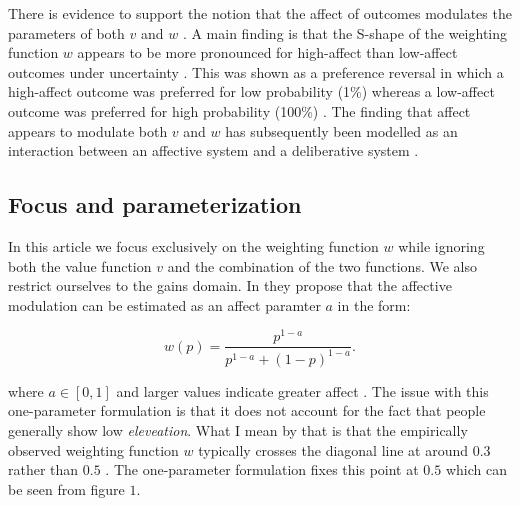 \documentclass[12pt]{article}
\begin{document}
There is evidence to support
the notion that the affect of outcomes modulates
the parameters of both $v$
\autocite{hsee2004music} and $w$ \autocite{
rottenstreich2001money}. A main finding is
that the S-shape of the weighting function
$w$ appears to be more pronounced
for high-affect than low-affect outcomes under
uncertainty \autocite{rottenstreich2001money}.
This was shown as a preference reversal in
which a high-affect outcome was preferred for
low probability (1\%) whereas a low-affect
outcome was preferred for high probability (100\%)
\autocite{rottenstreich2001money}.
The finding that affect appears to modulate
both $v$ and $w$ has subsequently been
modelled as an interaction between an
affective system and a deliberative system \textcite{
	mukherjee2010dual,
mukherjee2011thinking}.

\subsection{Focus and parameterization}

In this article we focus exclusively on the
weighting function $w$ while ignoring both
the value function $v$ and the combination
of the two functions. We also restrict ourselves
to the gains domain.
In \textcite{rottenstreich2001money} they
propose that the affective modulation can
be estimated as an affect paramter $a$
in the form:

\[
	w(p) = \frac{p^{1-a}}
	{p^{1-a}+(1-p)^{1-a}}
.\]

where $a \in [0, 1]$ and larger values indicate
greater affect \autocite{rottenstreich2001money}.
The issue with this one-parameter
formulation is that it
does not account for the fact that people
generally show low \emph{eleveation}.
What I mean by that is that the empirically
observed weighting function $w$ typically
crosses the diagonal line
at around $0.3$ rather than $0.5$
\autocite{gonzalez1999shape}. The one-parameter
formulation fixes this point at $0.5$
which can be seen from figure $1$.
\end{document}
